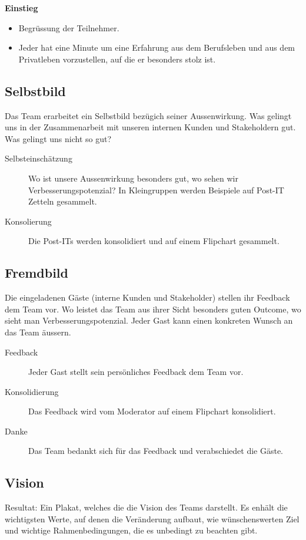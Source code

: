 \documentclass{article}
\begin{document}
\noindent\textbf{Einstieg}
\begin{itemize}
  \item[] Begrüssung der Teilnehmer.
  \item[] Jeder hat eine Minute um eine Erfahrung aus dem Berufsleben und aus dem Privatleben vorzustellen, auf die er besonders stolz ist.
\end{itemize}

\subsection*{Selbstbild}
Das Team erarbeitet ein Selbstbild bezügich seiner Aussenwirkung. Was gelingt uns in der Zusammenarbeit mit unseren internen Kunden und Stakeholdern gut. Was gelingt uns nicht so gut?

\begin{description}
  \item [Selbsteinschätzung] \noindent Wo ist unsere Aussenwirkung besonders gut, wo sehen wir Verbesserungspotenzial? In Kleingruppen werden Beispiele auf Post-IT Zetteln gesammelt.
  \item [Konsolierung] \noindent Die Post-ITs werden konsolidiert und auf einem Flipchart gesammelt.
\end{description}

\subsection*{Fremdbild}
Die eingeladenen Gäste (interne Kunden und Stakeholder) stellen ihr Feedback dem Team vor. Wo leistet das Team aus ihrer Sicht besonders guten Outcome, wo sieht man Verbesserungspotenzial. Jeder Gast kann einen konkreten Wunsch an das Team äussern.

\begin{description}
  \item [Feedback] \noindent Jeder Gast stellt sein persönliches Feedback dem Team vor.
  \item [Konsolidierung] \noindent Das Feedback wird vom Moderator auf einem Flipchart konsolidiert.
  \item [Danke] \noindent Das Team bedankt sich für das Feedback und verabschiedet die Gäste.
\end{description}


\subsection*{Vision}
Resultat: Ein Plakat, welches die die Vision des Teams darstellt. Es enhält die wichtigsten Werte, auf denen die Veränderung aufbaut, wie wünschenswerten Ziel und wichtige Rahmenbedingungen, die es unbedingt zu beachten gibt.
\end{document}
